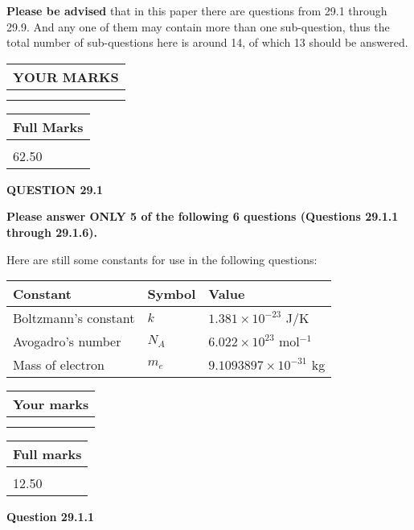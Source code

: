 \documentclass[12pt]{article}
\begin{document}
 
{\textbf{\large{Please be advised}}} that in this paper there are questions from
29.1 through
29.9.
And any one of them may contain more than one sub-question, thus the total number
of sub-questions here is around 14, of which
13 should be answered.
 
\vspace{0.3in}
 
 
   
   
  
\vspace{0.2in}
  
\noindent\begin{tabular}{|l|}
\hline
 YOUR MARKS  \\
\hline
 \\ 
 \\ 
\hline
\end{tabular}
\hspace{0.05in} \begin{tabular}{|l|}
\hline
 Full Marks  \\
\hline
 \\ 
62.50 \\
\hline
\end{tabular}
{\textbf{\Large{QUESTION
29.1 
}}}
  
  
 
{\textbf{\Large{Please answer ONLY
5 of the following
6 questions (Questions
29.1.1 through
29.1.6). }}}
 
Here are still some constants for use in the following questions:
 
 
\noindent\begin{tabular}{|l|l|l|}
\hline
Constant & Symbol & Value \\
\hline
 
Boltzmann's constant &
$k$ &
 $ 1.381 \times 10^{-23} $
J/K \\
\hline
 
Avogadro's number &
$N_A$ &
 $ 6.022 \times 10^{23} $
mol$^{-1}$ \\
\hline
 
Mass of electron &
$m_e$ &
 $ 9.1093897 \times 10^{-31} $
kg \\
\hline
 
\end{tabular}
 
  
\vspace{0.2in}
  
         \begin{tabular}{|l|}
\hline
 Your marks  \\
\hline
 \\ 
 \\ 
\hline
\end{tabular}
\hspace{0.05in} \begin{tabular}{|l|}
\hline
 Full marks  \\
\hline
 \\ 
12.50 \\
\hline
\end{tabular}
{\textbf{\Large{Question
29.1.1 
}}}
  
\end{document}
